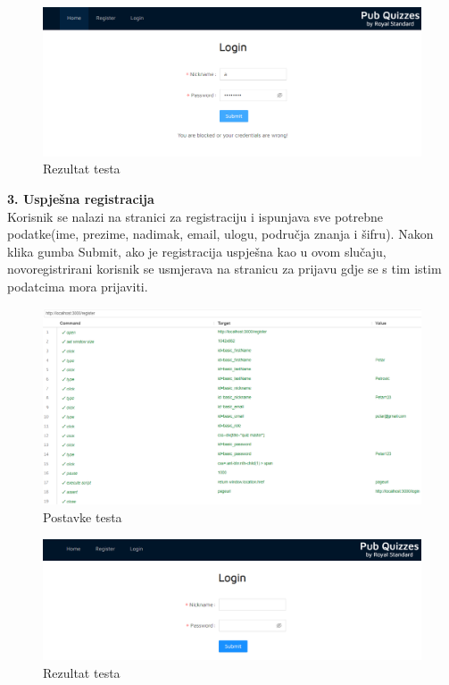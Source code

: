 				\begin{figure}[H]
					\includegraphics[width=\textwidth]{slike/NeuspjesnaPrijava2.PNG} 
					\caption{Rezultat testa}
					\label{fig:NeuspjesnaPrijava2}
				\end{figure}
				
			\eject

			\textbf{3. Uspješna registracija}\\
				
				Korisnik se nalazi na stranici za registraciju i ispunjava sve potrebne podatke(ime, prezime, nadimak, email, ulogu, područja znanja i šifru). Nakon klika gumba Submit, ako je registracija uspješna kao u ovom slučaju, novoregistrirani korisnik se usmjerava na stranicu za prijavu gdje se s tim istim podatcima mora prijaviti.

				\begin{figure}[H]
					\includegraphics[width=\textwidth]{slike/UspjesnaRegistracija1.PNG} 
					\caption{Postavke testa}
					\label{fig:UspjesnaRegistracija1}
				\end{figure}

				\begin{figure}[H]
					\includegraphics[width=\textwidth]{slike/UspjesnaRegistracija2.PNG} 
					\caption{Rezultat testa}
					\label{fig:UspjesnaRegistracija2}
				\end{figure}
				
